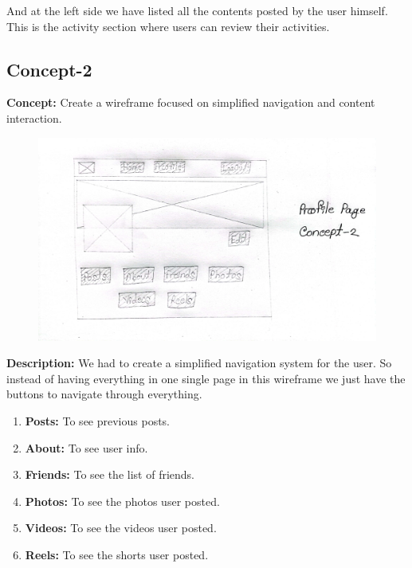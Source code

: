 \documentclass{report}
\begin{document}
And at the left side we have listed all the contents posted by the user himself. This is the activity section where users can review their activities.


\newpage



\subsection{Concept-2}

\textbf{Concept: }Create a wireframe focused on simplified navigation and content interaction.

\begin{figure}[h]
    \centering
    \includegraphics[width=0.5\linewidth]{6.jpg}
    \label{fig:enter-label}
\end{figure}


\textbf{Description: }We had to create a simplified navigation system for the user. So instead of having everything in one single page in this wireframe we just have the buttons to navigate through everything.
\begin{enumerate}
    \item \textbf{Posts: }To see previous posts.
    \item \textbf{About: }To see user info.
    \item \textbf{Friends: }To see the list of friends.
    \item \textbf{Photos: }To see the photos user posted.
    \item \textbf{Videos: }To see the videos user posted.
    \item \textbf{Reels: }To see the shorts user posted.
\end{enumerate}
\end{document}
